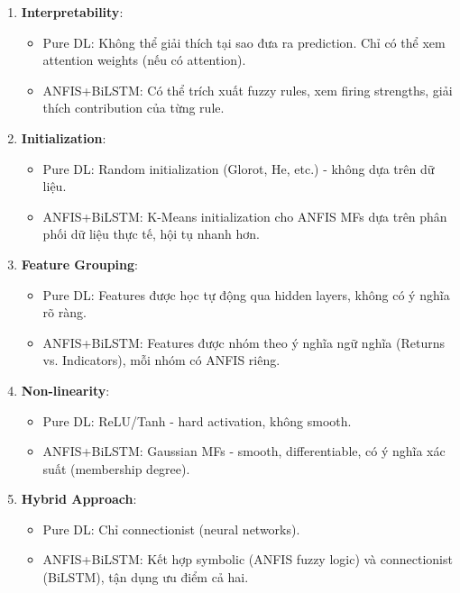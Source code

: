 \documentclass[12pt,a4paper]{article}
\begin{document}
\begin{enumerate}
    \item \textbf{Interpretability}:
    \begin{itemize}
        \item Pure DL: Không thể giải thích tại sao đưa ra prediction. Chỉ có thể xem attention weights (nếu có attention).
        \item ANFIS+BiLSTM: Có thể trích xuất fuzzy rules, xem firing strengths, giải thích contribution của từng rule.
    \end{itemize}
    
    \item \textbf{Initialization}:
    \begin{itemize}
        \item Pure DL: Random initialization (Glorot, He, etc.) - không dựa trên dữ liệu.
        \item ANFIS+BiLSTM: K-Means initialization cho ANFIS MFs dựa trên phân phối dữ liệu thực tế, hội tụ nhanh hơn.
    \end{itemize}
    
    \item \textbf{Feature Grouping}:
    \begin{itemize}
        \item Pure DL: Features được học tự động qua hidden layers, không có ý nghĩa rõ ràng.
        \item ANFIS+BiLSTM: Features được nhóm theo ý nghĩa ngữ nghĩa (Returns vs. Indicators), mỗi nhóm có ANFIS riêng.
    \end{itemize}
    
    \item \textbf{Non-linearity}:
    \begin{itemize}
        \item Pure DL: ReLU/Tanh - hard activation, không smooth.
        \item ANFIS+BiLSTM: Gaussian MFs - smooth, differentiable, có ý nghĩa xác suất (membership degree).
    \end{itemize}
    
    \item \textbf{Hybrid Approach}:
    \begin{itemize}
        \item Pure DL: Chỉ connectionist (neural networks).
        \item ANFIS+BiLSTM: Kết hợp symbolic (ANFIS fuzzy logic) và connectionist (BiLSTM), tận dụng ưu điểm cả hai.
    \end{itemize}
\end{enumerate}
\end{document}
